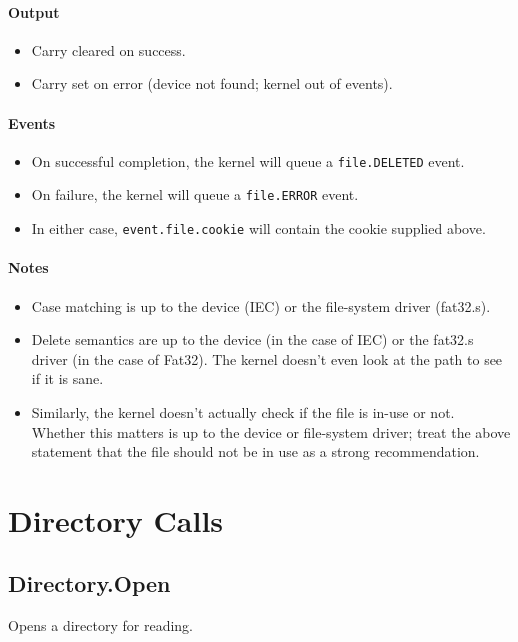 \paragraph{Output}

\begin{itemize}
\item Carry cleared on success.
\item Carry set on error (device not found; kernel out of events).
\end{itemize}

\paragraph{Events}

\begin{itemize}
\item On successful completion, the kernel will queue a \verb+file.DELETED+ event.
\item On failure, the kernel will queue a \verb+file.ERROR+ event.
\item In either case, \verb+event.file.cookie+ will contain the cookie supplied above.
\end{itemize}

\paragraph{Notes}

\begin{itemize}
\item Case matching is up to the device (IEC) or the file-system driver (fat32.s).
\item Delete semantics are up to the device (in the case of IEC) or the fat32.s driver (in the case of Fat32).  The kernel doesn't even look at the path to see if it is sane. 

\item Similarly, the kernel doesn't actually check if the file is in-use or not.  Whether this matters is up to the device or file-system driver; treat the above statement that the file should not be in use as a strong recommendation. 
\end{itemize}

\section*{Directory Calls}

\subsection*{Directory.Open}
Opens a directory for reading.

